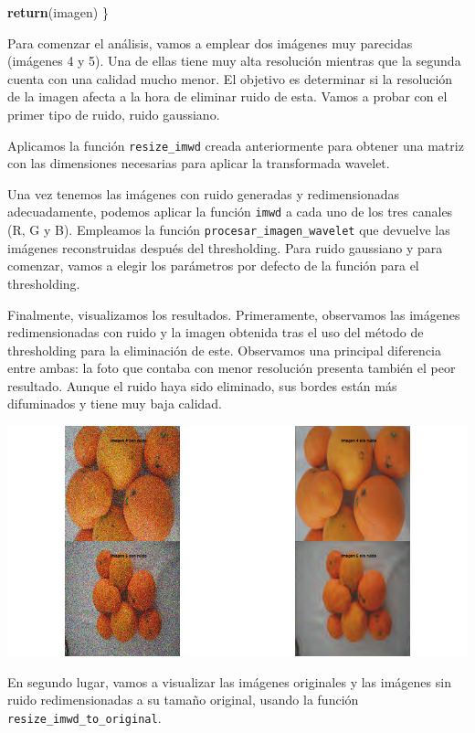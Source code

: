 \documentclass[
]{article}
\newenvironment{Shaded}{\begin{snugshade}}{\end{snugshade}}
\newcommand{\FunctionTok}[1]{\textcolor[rgb]{0.13,0.29,0.53}{\textbf{#1}}}
\newcommand{\NormalTok}[1]{#1}
\begin{document}
\begin{Shaded}
\begin{Highlighting}[]
  \FunctionTok{return}\NormalTok{(imagen)}
\NormalTok{\}}
\end{Highlighting}
\end{Shaded}

Para comenzar el análisis, vamos a emplear dos imágenes muy parecidas
(imágenes 4 y 5). Una de ellas tiene muy alta resolución mientras que la
segunda cuenta con una calidad mucho menor. El objetivo es determinar si
la resolución de la imagen afecta a la hora de eliminar ruido de esta.
Vamos a probar con el primer tipo de ruido, ruido gaussiano.

Aplicamos la función \texttt{resize\_imwd} creada anteriormente para
obtener una matriz con las dimensiones necesarias para aplicar la
transformada wavelet.

Una vez tenemos las imágenes con ruido generadas y redimensionadas
adecuadamente, podemos aplicar la función \texttt{imwd} a cada uno de
los tres canales (R, G y B). Empleamos la función
\texttt{procesar\_imagen\_wavelet} que devuelve las imágenes
reconstruidas después del thresholding. Para ruido gaussiano y para
comenzar, vamos a elegir los parámetros por defecto de la función para
el thresholding.

Finalmente, visualizamos los resultados. Primeramente, observamos las
imágenes redimensionadas con ruido y la imagen obtenida tras el uso del
método de thresholding para la eliminación de este. Observamos una
principal diferencia entre ambas: la foto que contaba con menor
resolución presenta también el peor resultado. Aunque el ruido haya sido
eliminado, sus bordes están más difuminados y tiene muy baja calidad.

\begin{center}\includegraphics[width=1\linewidth]{imwd/image4_5_gaussian} \end{center}

En segundo lugar, vamos a visualizar las imágenes originales y las
imágenes sin ruido redimensionadas a su tamaño original, usando la
función \texttt{resize\_imwd\_to\_original}.
\end{document}
